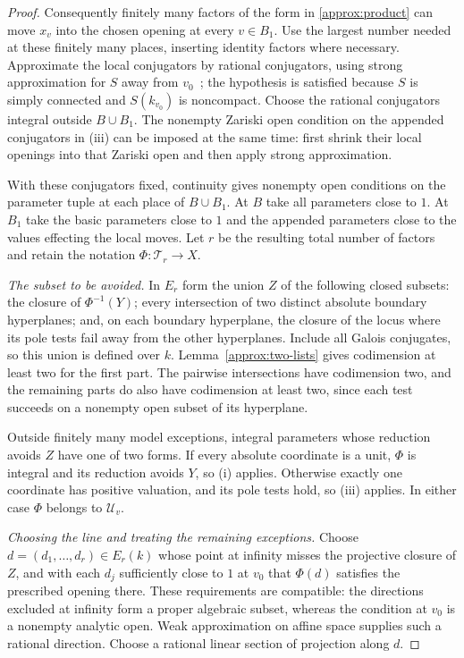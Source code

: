 \begin{proof}
Consequently finitely many factors of the form in
\eqref{approx:product} can move $x_v$ into the chosen
opening at every $v\in B_1$.  Use the largest number needed
at these finitely many places, inserting identity factors
where necessary.  Approximate the local conjugators by
rational conjugators, using strong approximation for $S$
away from $v_0$~\cite{PrasadSA}; the hypothesis is satisfied because
$S$ is simply connected and $S(k_{v_0})$ is noncompact.
Choose the rational conjugators integral outside
$B\cup B_1$.  The nonempty Zariski open condition on the
appended conjugators in \textup{(iii)} can be imposed at
the same time: first shrink their local openings into
that Zariski open and then apply strong approximation.

With these conjugators fixed, continuity gives nonempty
open conditions on the parameter tuple at each place of
$B\cup B_1$.  At $B$ take all parameters close to $1$.
At $B_1$ take the basic parameters close to $1$ and the
appended parameters close to the values effecting the
local moves.  Let $r$ be the resulting total number of
factors and retain the notation $\Phi:\mathcal T_r\to X$.

\emph{The subset to be avoided.}
In $E_r$ form the union $Z$ of the following closed subsets:
the closure of $\Phi^{-1}(Y)$; every intersection of two
distinct absolute boundary hyperplanes; and, on each
boundary hyperplane, the closure of the locus where its
pole tests fail away from the other hyperplanes.  Include
all Galois conjugates, so this union is defined over $k$.
Lemma~\ref{approx:two-lists} gives codimension at least two
for the first part.  The pairwise intersections have
codimension two, and the remaining parts do also have
codimension at least two, since each test succeeds on a
nonempty open subset of its hyperplane.

Outside finitely many model exceptions, integral parameters
whose reduction avoids $Z$ have one of two forms.  If
every absolute coordinate is a unit, $\Phi$ is integral
and its reduction avoids $Y$, so \textup{(i)} applies.
Otherwise exactly one coordinate has positive valuation,
and its pole tests hold, so \textup{(iii)} applies.
In either case $\Phi$ belongs to $\mathcal U_v$.

\emph{Choosing the line and treating the remaining exceptions.}
Choose $d=(d_1,\ldots,d_r)\in E_r(k)$ whose point at
infinity misses the projective closure of $Z$, and with
each $d_j$ sufficiently close to $1$ at $v_0$ that
$\Phi(d)$ satisfies the prescribed opening there.
These requirements are compatible: the directions excluded
at infinity form a proper algebraic subset, whereas the
condition at $v_0$ is a nonempty analytic open.  Weak
approximation on affine space supplies such a rational
direction.  Choose a rational linear section of projection
along $d$.


\end{proof}
